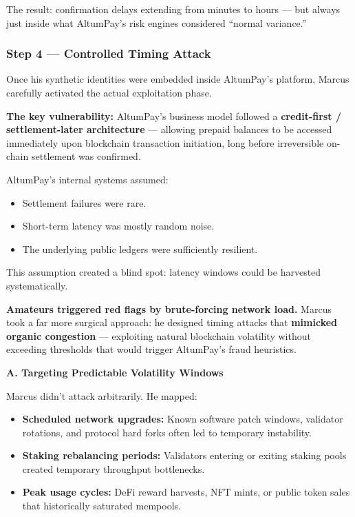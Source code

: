 The result: confirmation delays extending from minutes to hours --- but always just inside what AltumPay's risk engines considered “normal variance.”

\subsubsection*{Step 4 --- Controlled Timing Attack}

Once his synthetic identities were embedded inside AltumPay’s platform, Marcus carefully activated the actual exploitation phase.

\medskip

\textbf{The key vulnerability:} AltumPay’s business model followed a \textbf{credit-first / settlement-later architecture} --- allowing prepaid balances to be accessed immediately upon blockchain transaction initiation, long before irreversible on-chain settlement was confirmed.

\medskip

AltumPay's internal systems assumed:

\begin{itemize}
    \item Settlement failures were rare.
    \item Short-term latency was mostly random noise.
    \item The underlying public ledgers were sufficiently resilient.
\end{itemize}

This assumption created a blind spot: latency windows could be harvested systematically.

\medskip

\textbf{Amateurs triggered red flags by brute-forcing network load.}  
Marcus took a far more surgical approach: he designed timing attacks that \textbf{mimicked organic congestion} --- exploiting natural blockchain volatility without exceeding thresholds that would trigger AltumPay’s fraud heuristics.

\medskip

\textbf{A. Targeting Predictable Volatility Windows}

Marcus didn’t attack arbitrarily. He mapped:

\begin{itemize}
    \item \textbf{Scheduled network upgrades:} Known software patch windows, validator rotations, and protocol hard forks often led to temporary instability.
    \item \textbf{Staking rebalancing periods:} Validators entering or exiting staking pools created temporary throughput bottlenecks.
    \item \textbf{Peak usage cycles:} DeFi reward harvests, NFT mints, or public token sales that historically saturated mempools.
\end{itemize}

